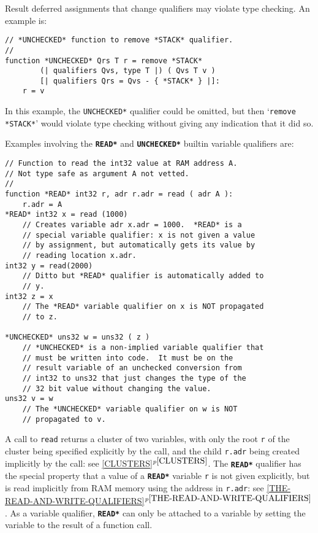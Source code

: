 \documentclass[12pt]{article}
\newcommand{\TT}[1]{{\tt \bfseries #1}}
\newcommand{\itemref}[1]{\ref{#1}$^{p\pageref{#1}}$}
\newenvironment{indpar}[1][0.3in]%
	{\begin{list}{}%
		     {\setlength{\itemsep}{0in}%
		      \setlength{\topsep}{0in}%
		      \setlength{\parsep}{1ex}%
		      \setlength{\labelwidth}{#1}%
		      \setlength{\leftmargin}{#1}%
		      \addtolength{\leftmargin}{\labelsep}}%
	 \item}%
	{\end{list}}
\begin{document}
Result deferred assignments that change qualifiers may violate
type checking.  An example is:
\begin{indpar}\begin{verbatim}
// *UNCHECKED* function to remove *STACK* qualifier.
//
function *UNCHECKED* Qrs T r = remove *STACK*
        (| qualifiers Qvs, type T |) ( Qvs T v )
        [| qualifiers Qrs = Qvs - { *STACK* } |]:
    r = v
\end{verbatim}\end{indpar}

In this example, the {\tt *UNCHECKED*} qualifier could be
omitted, but then `{\tt remove *STACK*}' would violate
type checking without giving any indication that it did so.

Examples involving the \TT{*READ*} and \TT{*UNCHECKED*}
builtin variable qualifiers are:
\begin{indpar}\begin{verbatim}
// Function to read the int32 value at RAM address A.
// Not type safe as argument A not vetted.
//
function *READ* int32 r, adr r.adr = read ( adr A ):
    r.adr = A
*READ* int32 x = read (1000)
    // Creates variable adr x.adr = 1000.  *READ* is a
    // special variable qualifier: x is not given a value
    // by assignment, but automatically gets its value by
    // reading location x.adr.
int32 y = read(2000)
    // Ditto but *READ* qualifier is automatically added to
    // y.
int32 z = x
    // The *READ* variable qualifier on x is NOT propagated
    // to z.

*UNCHECKED* uns32 w = uns32 ( z )
    // *UNCHECKED* is a non-implied variable qualifier that
    // must be written into code.  It must be on the
    // result variable of an unchecked conversion from
    // int32 to uns32 that just changes the type of the
    // 32 bit value without changing the value.
uns32 v = w
    // The *UNCHECKED* variable qualifier on w is NOT
    // propagated to v.
\end{verbatim}\end{indpar}

A call to {\tt read} returns a cluster of
two variables, with only the root {\tt r} of the cluster being
specified explicitly by the call, and the child {\tt r.adr} being
created implicitly by the call: see \itemref{CLUSTERS}.
The \TT{*READ*} qualifier has the special property that a value of a \TT{*READ*}
variable {\tt r} is not given explicitly, but is read implicitly from
RAM memory using the address in {\tt r.adr}:
see \itemref{THE-READ-AND-WRITE-QUALIFIERS}.
As a variable qualifier, \TT{*READ*} can only be attached to
a variable by setting the variable to the result of a
function call.
\end{document}

